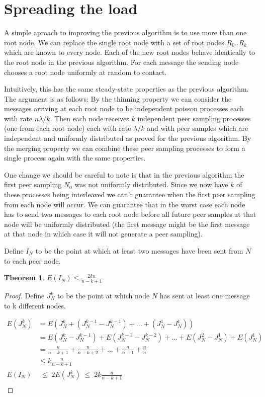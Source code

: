 \documentclass[a4paper,10pt]{article}
\newtheorem*{thm}{Theorem}
\begin{document}
\section{Spreading the load}

A simple aproach to improving the previous algorithm is to use more than one root node. We can replace the single root node with a set of root nodes $R_0 .. R_k$ which are known to every node. Each of the new root nodes behave identically to the root node in the previous algorithm. For each message the sending node chooses a root node uniformly at random to contact. 

Intuitively, this has the same steady-state properties as the previous algorithm. The argument is as follows: By the thinning property we can consider the messages arriving at each root node to be independent poisson processes each with rate $n \lambda / k$. Then each node receives $k$ independent peer sampling processes (one from each root node) each with rate $\lambda / k$ and with peer samples which are independent and uniformly distributed as proved for the previous algorithm. By the merging property we can combine these peer sampling processes to form a single process again with the same properties. 

One change we should be careful to note is that in the previous algorithm the first peer sampling $N_0$ was not uniformly distributed. Since we now have $k$ of these processes being interleaved we can't guarantee when the first peer sampling from each node will occur. We can guarantee that in the worst case each node has to send two messages to each root node before all future peer samples at that node will be uniformly distributed (the first message might be the first message at that node in which case it will not generate a peer sampling).

Define $I_N$ to be the point at which at least two messages have been sent from $N$ to each peer node.

\begin{thm}$E(I_N) \leq \frac{2kn}{n-k+1}$\end{thm}  

\begin{proof}
Define $J^k_N$ to be the point at which node $N$ has sent at least one message to k different nodes.

\begin{align*}
E(J^k_N) &= E(J^k_N + (J^{k-1}_N - J^{k-1}_N) + ... + (J^1_N - J^1_N)) \\
  &= E(J^k_N - J^{k-1}_N) + E(J^{k-1}_N - J^{k-2}_N) + ... + E(J^2_N - J^1_N) + E(J^1_N) \\
  &= \frac{n}{n-k+1} + \frac{n}{n-k+2} + ... + \frac{n}{n-1} + \frac{n}{n} \\
  &\leq k\frac{n}{n-k+1} \\
E(I_N) & \;\leq\; 2 E(J^k_N) \;\leq\; 2k\frac{n}{n-k+1} \\
\end{align*}
\end{proof}
\end{document}
